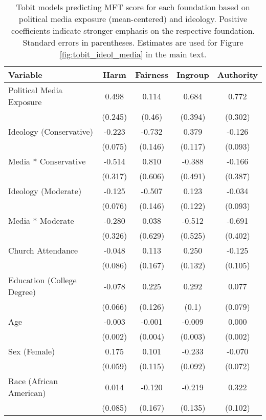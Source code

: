 \begin{table}[ht]
\centering
\caption{Tobit models predicting MFT score for each foundation based 
           on political media exposure (mean-centered) and ideology. Positive coefficients indicate 
           stronger emphasis on the respective foundation. Standard errors in parentheses. Estimates 
           are used for Figure \ref{fig:tobit_ideol_media} in the main text.} 
\label{tab:tobit_ideol_media}
\begingroup\footnotesize
\begin{tabular}{lcccc}
  \hline
Variable & Harm & Fairness & Ingroup & Authority \\ 
  \hline
Political Media Exposure &  0.498 &  0.114 &  0.684 &  0.772 \\ 
   & (0.245) & (0.46) & (0.394) & (0.302) \\ 
  Ideology (Conservative) & -0.223 & -0.732 &  0.379 & -0.126 \\ 
   & (0.075) & (0.146) & (0.117) & (0.093) \\ 
  Media * Conservative & -0.514 &  0.810 & -0.388 & -0.166 \\ 
   & (0.317) & (0.606) & (0.491) & (0.387) \\ 
  Ideology (Moderate) & -0.125 & -0.507 &  0.123 & -0.034 \\ 
   & (0.076) & (0.146) & (0.122) & (0.093) \\ 
  Media * Moderate & -0.280 &  0.038 & -0.512 & -0.691 \\ 
   & (0.326) & (0.629) & (0.525) & (0.402) \\ 
  Church Attendance & -0.048 &  0.113 &  0.250 & -0.125 \\ 
   & (0.086) & (0.167) & (0.132) & (0.105) \\ 
  Education (College Degree) & -0.078 &  0.225 &  0.292 &  0.077 \\ 
   & (0.066) & (0.126) & (0.1) & (0.079) \\ 
  Age & -0.003 & -0.001 & -0.009 &  0.000 \\ 
   & (0.002) & (0.004) & (0.003) & (0.002) \\ 
  Sex (Female) &  0.175 &  0.101 & -0.233 & -0.070 \\ 
   & (0.059) & (0.115) & (0.092) & (0.072) \\ 
  Race (African American) &  0.014 & -0.120 & -0.219 &  0.322 \\ 
   & (0.085) & (0.167) & (0.135) & (0.102) \\ 

\end{tabular}
\end{table}
